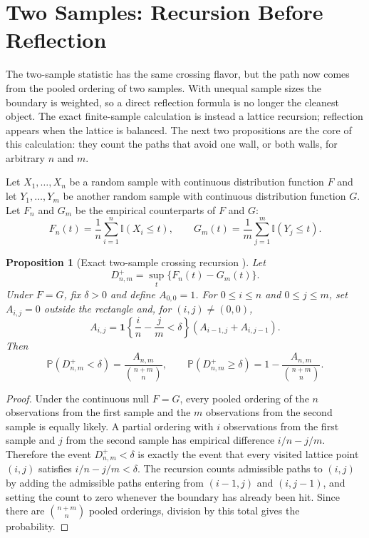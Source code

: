 \documentclass[12pt]{article}
\newtheorem{proposition}[theorem]{Proposition}
\theoremstyle{remark}
\begin{document}
\section{Two Samples: Recursion Before Reflection}
\label{sec:supp-two-sample-recursions}
The two-sample statistic has the same crossing flavor, but the path now comes
from the pooled ordering of two samples. With unequal sample sizes the boundary
is weighted, so a direct reflection formula is no longer the cleanest object.
The exact finite-sample calculation is instead a lattice recursion; reflection
appears when the lattice is balanced. The next two propositions are the
core of this calculation: they count the paths that avoid one wall, or
both walls, for arbitrary $n$ and $m$.

Let $X_1,\ldots,X_n$ be a random sample with continuous distribution function $F$ and let $Y_1,\ldots,Y_m$ be another random sample with continuous distribution function $G$. Let $F_n$ and $G_m$ be the empirical counterparts of $F$ and $G$:
\[
F_n(t)=\frac{1}{n}\sum_{i=1}^n\mathbb{I}(X_i\le t),
\qquad
G_m(t)=\frac{1}{m}\sum_{j=1}^m\mathbb{I}(Y_j\le t).
\]

\begin{proposition}[Exact two-sample crossing recursion \cite{feller1968introduction}]
\label{prop:one-wall-recursion}
Let
\[
D_{n,m}^{+}=\sup_t\{F_n(t)-G_m(t)\}.
\]
Under $F=G$, fix $\delta>0$ and define $A_{0,0}=1$. For $0\le i\le n$ and
$0\le j\le m$, set $A_{i,j}=0$ outside the rectangle and, for $(i,j)\ne(0,0)$,
\[
A_{i,j}=
\mathbf{1}\left\{\frac{i}{n}-\frac{j}{m}<\delta\right\}
\left(A_{i-1,j}+A_{i,j-1}\right).
\]
Then
\[
\mathbb{P}\left(D_{n,m}^{+}<\delta\right)
=\frac{A_{n,m}}{\binom{n+m}{n}},
\qquad
\mathbb{P}\left(D_{n,m}^{+}\ge\delta\right)
=1-\frac{A_{n,m}}{\binom{n+m}{n}}.
\]
\end{proposition}

\begin{proof}
Under the continuous null $F=G$, every pooled ordering of the $n$ observations
from the first sample and the $m$ observations from the second sample is equally
likely. A partial ordering with $i$ observations from the first sample and $j$
from the second sample has empirical difference $i/n-j/m$. Therefore the event
$D_{n,m}^{+}<\delta$ is exactly the event that every visited lattice point
$(i,j)$ satisfies $i/n-j/m<\delta$. The recursion counts admissible paths to
$(i,j)$ by adding the admissible paths entering from $(i-1,j)$ and $(i,j-1)$,
and setting the count to zero whenever the boundary has already been hit. Since
there are $\binom{n+m}{n}$ pooled orderings, division by this total gives the
probability.
\end{proof}
\end{document}
